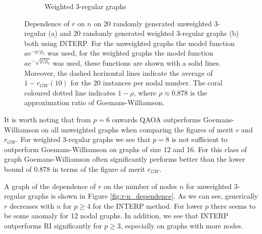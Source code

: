 \begin{figure}[H]
\begin{subfigure}[t]{0.65\textwidth}
		\captionsetup{justification=centering}
		\caption{Weighted 3-regular graphs}
	\end{subfigure}
	\caption{Dependence of $r$ on $n$ on 20 randomly generated unweighted 3-regular (a) and 20 randomly generated weighted 3-regular graphs (b) both using INTERP. For the unweighted graphs the model function $ae^{-p/p_0}$ was used, for the weighted graphs the model function $ae^{-\sqrt{p/p_0}}$ was used, these functions are shown with a solid lines. Moreover, the dashed horizontal lines indicate the average of $1-r_{GW}(10)$ for the 20 instances per nodal number. The coral coloured dotted line indicates $1-\rho$, where $\rho \approx 0.878$ is the approximation ratio of Goemans-Williamson.}
	\label{fig:fom-exp-fit}
\end{figure}
It is worth noting that from $p=6$ onwards QAOA outperforms Goemans-Williamson on all unweighted graphs when comparing the figures of merit $r$ and $r_{GW}$. For weighted 3-regular graphs we see that $p=8$ is not sufficient to outperform Goemans-Williamson on graphs of size 12 and 16. For this class of graph Goemans-Williamson often significantly performs better than the lower bound of $0.878$ in terms of the figure of merit $r_{GW}$. 

A graph of the dependence of $r$ on the number of nodes $n$ for unweighted 3-regular graphs is shown in Figure \ref{fig:r-n_dependence}. As we can see, generically $r$ decreases with $n$ for $p \geq 4$ for the INTERP method. For lower $p$ there seems to be some anomaly for 12 nodal graphs. In addition, we see that INTERP outperforms RI significantly for $p \geq 3$, especially on graphs with more nodes.


